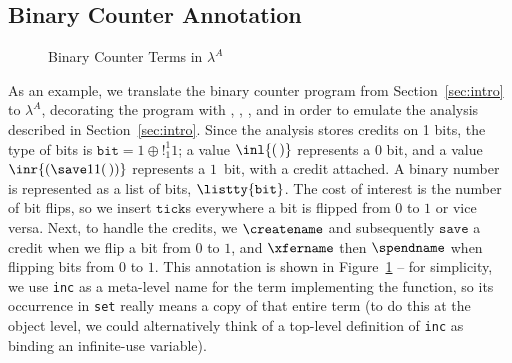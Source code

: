 \subsection{Binary Counter Annotation}

\begin{figure}
  
  \vspace{-0.15in}
  \caption{Binary Counter Terms in $\lambda^A$}
  \label{fig:bc-term}
\end{figure}

As an example, we translate the binary counter program from
Section~\ref{sec:intro} to $\lambda^A$, decorating the program with
\createname, \spendname, \savename, and \xfername\/ in order to emulate the
analysis described in Section~\ref{sec:intro}.  Since the analysis
stores credits on 1 bits, the type of bits is $\texttt{bit} = 1 \oplus
!^1_1 1$; a value $\inl {(\,)}$ represents a $0$ bit, and a value $\inr
{(\save 1 1 {(\, )})}$ represents a $1$~bit, with a credit attached. A
binary number is represented as a list of bits, $\listty
{\texttt{bit}}$.
The cost of interest is the number of bit flips, so 
we insert $\texttt{tick}$s everywhere a bit is flipped from
$0$ to $1$ or vice versa. Next, to handle the credits, we
$\createname$ and subsequently $\texttt{save}$ a credit when we
flip a bit from $0$ to $1$, and $\xfername$ then $\spendname$
when flipping bits from $0$ to $1$.
This annotation is shown in Figure~\ref{fig:bc-term} -- for simplicity, we use \texttt{inc} as a meta-level name for the term
implementing the function, so its occurrence in \texttt{set} really means
a copy of that entire term (to do this at the object level, we could
alternatively think of a top-level definition of \texttt{inc} as binding
an infinite-use variable).


